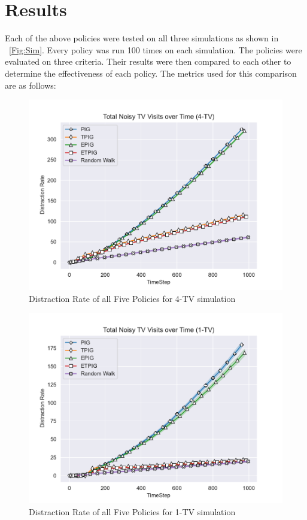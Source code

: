 \documentclass[12pt]{thesis}
\begin{document}
\chapter{Results}
Each of the above policies were tested on all three simulations as shown in \figurename~\ref{Fig:Sim}. Every policy was run 100 times on each simulation. The policies were evaluated on three criteria. Their results were then compared to each other to determine the effectiveness of each policy. The metrics used for this comparison are as follows:
\begin{figure}
	\begin{center}
		\includegraphics[scale=0.8]{"images/Distraction_Rate_4-TV.pdf"}
	\end{center}
	\caption{Distraction Rate of all Five Policies for 4-TV simulation}
	\label{Fig:DRFP4TV}
\end{figure}
\begin{figure}
	\begin{center}
		\includegraphics[scale=0.8]{"images/Distraction_Rate_1-TV.pdf"}
	\end{center}
	\caption{Distraction Rate of all Five Policies for 1-TV simulation}
	\label{Fig:DRFP1TV}
\end{figure}
\end{document}
